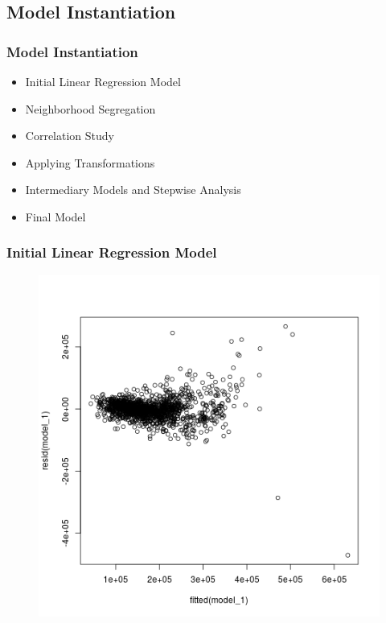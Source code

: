 \documentclass{beamer}
\begin{document}
\begin{frame}
\section{Model Instantiation}
\frametitle{Model Instantiation}
\begin{itemize}
\item Initial Linear Regression Model
\item Neighborhood Segregation
\item Correlation Study
\item Applying Transformations
\item Intermediary Models and Stepwise Analysis
\item Final Model
\end{itemize}
\end{frame}

\begin{frame}
\frametitle{Initial Linear Regression Model}
\begin{figure}
\includegraphics[width=0.75\linewidth,keepaspectratio=true]{img/heteroscedastic.png}
\end{figure}
\end{frame}
\end{document}
